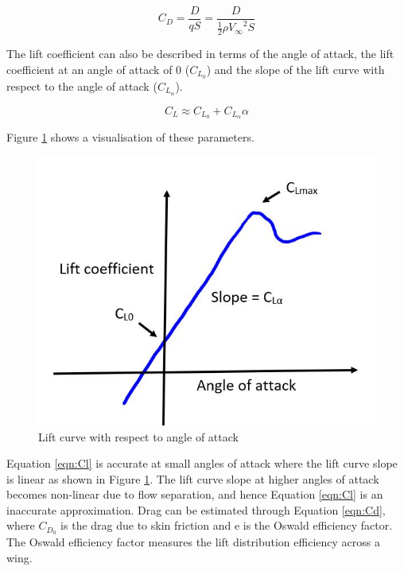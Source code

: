 \begin{equation}
     C_D = \frac{D}{qS} = \frac{D}{\frac{1}{2}\rho {V_\infty}^2 S}
     \label{eqn:drag}
\end{equation}

The lift coefficient can also be described in terms of the angle of attack, the lift coefficient at an angle of attack of 0 ($C_{L_0}$) and the slope of the lift curve with respect to the angle of attack ($C_{L_\alpha}$). 

\begin{equation}
    C_L \approx C_{L_0} + C_{L_\alpha}\alpha
    \label{eqn:Cl}
\end{equation}

Figure \ref{fig:Clalpha} shows a visualisation of these parameters. 

\begin{figure}[H]
    \centering
    \includegraphics[scale = 0.8]{02_Background/Figs/liftcurveslope.JPG}
    \caption{Lift curve with respect to angle of attack}
    \label{fig:Clalpha}
\end{figure}

Equation \ref{eqn:Cl} is accurate at small angles of attack where the lift curve slope is linear as shown in Figure \ref{fig:Clalpha}. The lift curve slope at higher angles of attack becomes non-linear due to flow separation, and hence Equation \ref{eqn:Cl} is an inaccurate approximation. Drag can be estimated through Equation \ref{eqn:Cd}, where $C_{D_0}$ is the drag due to skin friction and e is the Oswald efficiency factor. The Oswald efficiency factor measures the lift distribution efficiency across a wing. 


